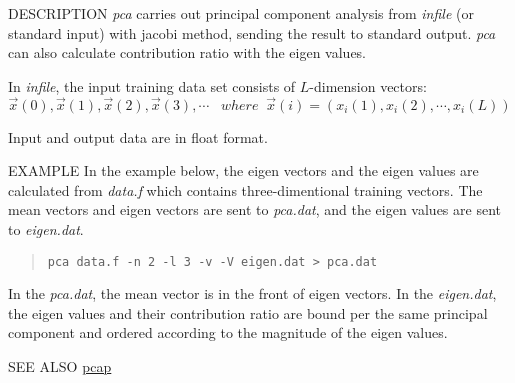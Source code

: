 \begin{synopsis}
 \item[pca] [ --l $L$ ] [ --n $N$] [ --i $I$] [ --e $e$]
 [ --v ]  [ --V $fn$ ] [ {\em infile} ] 
\end{synopsis}

\begin{qsection}{DESCRIPTION}
 {\em pca} carries out principal component analysis
 from {\em infile} (or standard input) with jacobi method,
 sending the result to standard output.
 {\em pca} can also calculate contribution ratio with the eigen values.

 In {\em infile},
 the input training data set consists of $L$-dimension vectors:
 \[
 \Vec{x}(0), \Vec{x}(1), \Vec{x}(2), \Vec{x}(3), \cdots \;\;\;
 where\;\;\Vec{x}(i) = (x_{i}(1), x_{i}(2), \cdots, x_{i}(L))
 \]

Input and output data are in float format. 
\end{qsection}

\begin{options}
\end{options}

\begin{qsection}{EXAMPLE}
 In the example below,
 the eigen vectors and the eigen values are
 calculated  from {\em data.f}
 which contains three-dimentional training vectors.
 The mean vectors and eigen vectors are sent to
 {\em pca.dat}, and the eigen values are sent to {\em eigen.dat}.
\begin{quote}
  \verb!pca data.f -n 2 -l 3 -v -V eigen.dat > pca.dat!
\end{quote} 
In the {\em pca.dat}, the mean vector is in the front of
eigen vectors.
In the {\em eigen.dat}, 
the eigen values and their contribution ratio are bound per
the same principal component and ordered according to the
magnitude of the eigen values.
\end{qsection} 
\begin{qsection}{SEE ALSO}
 \hyperlink{pcap}{pcap}
\end{qsection}
